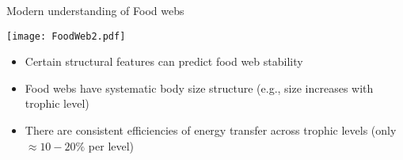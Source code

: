 \begin{frame}{Modern understanding of Food webs}

  \begin{center}
    \texttt{[image: FoodWeb2.pdf]}
  \end{center} 
  \vspace{-6pt}
  \begin{itemize}[<+->] \itemsep0pt
    \item Certain structural features can predict  food web stability\footnotemark[1]
    \item Food webs have systematic body size structure (e.g., size increases with trophic level)\footnotemark[2]
    \item There are consistent efficiencies of energy transfer across trophic levels (only $\approx 10-20\%$ per level)
 \end{itemize} 

 
\end{frame}

